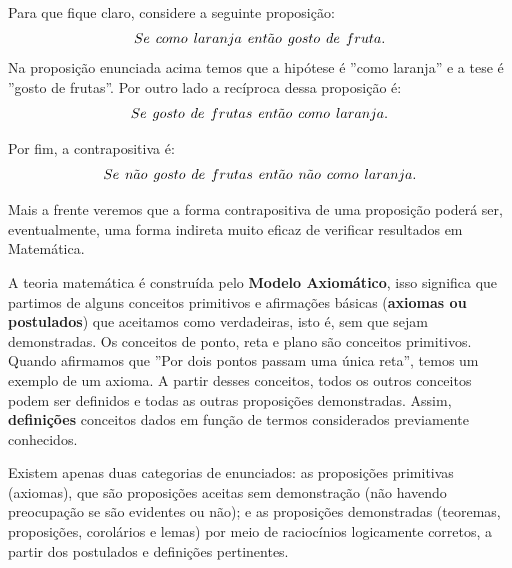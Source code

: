Para que fique claro, considere a seguinte proposição:
$$Se \hspace{0,15cm} como \hspace{0,15cm} laranja \hspace{0,15cm} ent\tilde{a}o \hspace{0,15cm} gosto \hspace{0,15cm} de \hspace{0,15cm} fruta.$$
Na proposição enunciada acima temos que a hipótese é ''como laranja'' e a tese é ''gosto de frutas''. Por outro lado a recíproca dessa proposição é:
$$Se \hspace{0,15cm} gosto \hspace{0,15cm} de \hspace{0,15cm} frutas \hspace{0,15cm} ent\tilde{a}o  \hspace{0,15cm} como \hspace{0,15cm} laranja .$$

Por fim, a contrapositiva é:
$$Se \hspace{0,15cm} n\tilde{a}o \hspace{0,15cm} gosto \hspace{0,15cm} de \hspace{0,15cm} frutas \hspace{0,15cm} ent\tilde{a}o \hspace{0,15cm} n\tilde{a}o \hspace{0,15cm} como \hspace{0,15cm}laranja .  $$

Mais a frente veremos que a forma contrapositiva de uma proposição poderá ser, eventualmente, uma forma indireta muito eficaz de verificar resultados em Matemática.

A teoria matemática é construída pelo \textbf{Modelo Axiomático}, isso significa que partimos de alguns conceitos primitivos e afirmações básicas (\textbf{axiomas ou postulados}) que aceitamos como verdadeiras, isto é, sem que sejam demonstradas. Os conceitos de ponto, reta e plano são conceitos primitivos. Quando afirmamos que ''Por dois pontos passam uma única reta'', temos um exemplo de um axioma. A partir desses conceitos, todos os outros conceitos podem ser definidos e todas as outras proposições demonstradas. Assim, \textbf{definições}  conceitos dados em função de termos considerados previamente conhecidos.

Existem apenas duas categorias de enunciados: as proposições
primitivas (axiomas), que são proposições aceitas sem demonstração (não havendo preocupação se
são evidentes ou não); e as proposições demonstradas (teoremas, proposições, corolários e
lemas) por meio de raciocínios logicamente corretos, a partir dos postulados e definições pertinentes.

